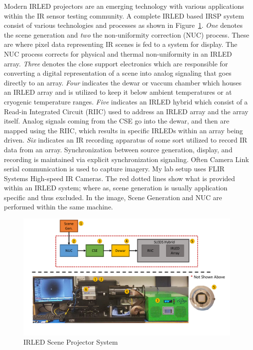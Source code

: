     Modern IRLED projectors are an emerging technology with various applications within the IR sensor testing community. A complete IRLED based IRSP system consist of various technologies and processes as shown in Figure~\ref{fig:sleds_system}. \emph{One} denotes the scene generation and \emph{two} the non-uniformity correction (NUC) process. These are where pixel data representing IR scenes is fed to a system for display. The NUC process corrects for physical and thermal non-uniformity\cite{BarakhshanEtAl2017} in an IRLED array\cite{BarakhshanEtAl2018}. \emph{Three} denotes the close support electronics\cite{ejzak4} which are responsible for converting a digital representation of a scene into analog signaling that goes directly to an array. \emph{Four} indicates the dewar\cite{lang1, MarksEtAl2017} or vaccum chamber which houses an IRLED array and is utilized to keep it below ambient temperatures or at cryogenic temperature ranges. \emph{Five} indicates an IRLED hybrid which consist of a Read-in Integrated Circuit (RIIC)\cite{HernandezEtAl2017} used to address an IRLED array and the array itself. Analog signals coming from the CSE go into the dewar, and then are mapped using the RIIC, which results in specific IRLEDs within an array being driven. \emph{Six} indicates an IR recording apparatus of some sort utilized to record IR data from an array. Synchronization between source generation, display, and recording is maintained via explicit synchronization signaling. Often Camera Link serial communication\cite{CameraLink2000, zhu2008design} is used to capture imagery. My lab setup uses FLIR Systems High-speed IR Cameras\cite{FLIR1, FLIR2}. The red dotted lines show what is provided within an IRLED system; where as, scene generation is usually application specific and thus excluded. In the image, Scene Generation and NUC are performed within the same machine.

    \begin{figure}
        \centering
        \includegraphics[trim=0.45in 1.25in 0.0in 0in,width=1.0\textwidth]{fig/sleds_system.pdf}
        \caption{IRLED Scene Projector System}
        \label{fig:sleds_system}
    \end{figure}

